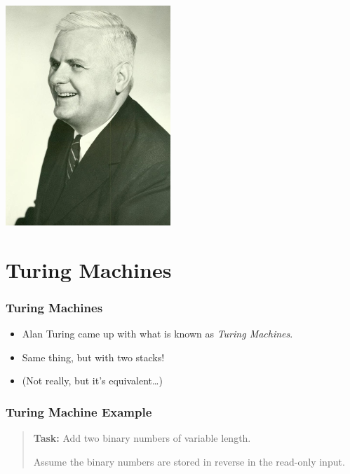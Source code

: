\documentclass[mathserif]{beamer}
\begin{document}
\begin{frame}
\begin{multicols}{2}
    \includegraphics[width=0.9\linewidth]{media/church.jpg}
  \end{multicols}
\end{frame}

\section{Turing Machines}
\begin{frame}
  \frametitle{Turing Machines}

  \begin{itemize}
    \item Alan Turing came up with what is known as \emph{Turing Machines}.

    \item Same thing, but with two stacks!

    \item (Not really, but it's equivalent\ldots)
  \end{itemize}
\end{frame}

\begin{frame}
  \frametitle{Turing Machine Example}

  \begin{quote}
    \textbf{Task:} Add two binary numbers of variable length. 

    Assume the binary numbers are stored in reverse in the read-only input.
  \end{quote}
\end{frame}
\end{document}
